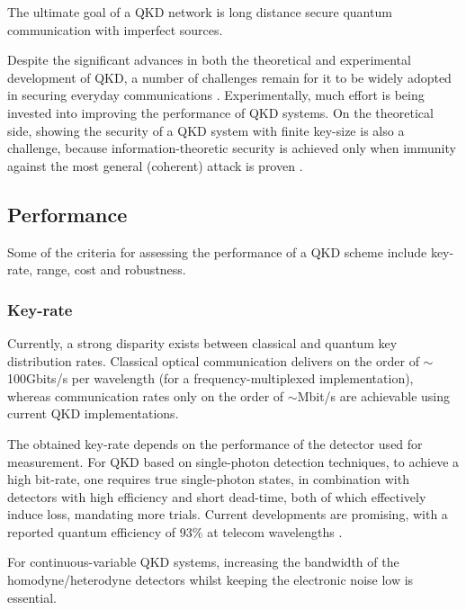 The ultimate goal of a QKD network is long distance secure quantum communication with imperfect sources.

Despite the significant advances in both the theoretical and experimental development of QKD, a number of challenges remain for it to be widely adopted in securing everyday communications \cite{bib:RevModPhys.81.1301, bib:diamanti2016practical}. Experimentally, much effort is being invested into improving the performance of QKD systems. On the theoretical side, showing the security of a QKD system with finite key-size is also a challenge, because information-theoretic security is achieved only when immunity against the most general (coherent) attack is proven \cite{bib:diamanti2016practical}.

\subsection{Performance}

Some of the criteria for assessing the performance of a QKD scheme include key-rate, range, cost and robustness.

\subsubsection{Key-rate}

Currently, a strong disparity exists between classical and quantum key distribution rates. Classical optical communication delivers on the order of $\sim$100Gbits/s per wavelength (for a frequency-multiplexed implementation), whereas communication rates only on the order of $\sim$Mbit/s are achievable using current QKD implementations.

The obtained key-rate depends on the performance of the detector used for measurement. For QKD based on single-photon detection techniques, to achieve a high bit-rate, one requires true single-photon states, in combination with detectors with high efficiency and short dead-time, both of which effectively induce loss, mandating more trials. Current developments are promising, with a reported quantum efficiency of $93\%$ at telecom wavelengths \cite{bib:marsili2013detecting}.

For continuous-variable QKD systems, increasing the bandwidth of the homodyne/heterodyne detectors whilst keeping the electronic noise low is essential.

